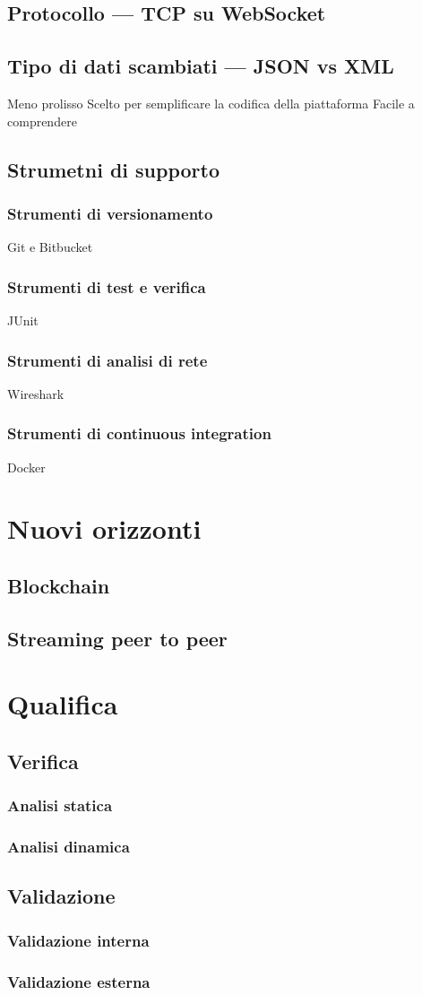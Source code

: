 	\subsection{Protocollo --- TCP su WebSocket}

	\subsection{Tipo di dati scambiati --- JSON vs XML}
	 Meno prolisso
	 Scelto per semplificare la codifica della piattaforma
	 Facile a comprendere
	\subsection{Strumetni di supporto}
				\subsubsection{Strumenti di versionamento}
			Git e Bitbucket
				\subsubsection{Strumenti di test e verifica}
			JUnit
				\subsubsection{Strumenti di analisi di rete}
			Wireshark
				\subsubsection{Strumenti di continuous integration}
			Docker
\section{Nuovi orizzonti}
	\subsection{Blockchain}
	\subsection{Streaming peer to peer}

\section{Qualifica}
	\subsection{Verifica}
				\subsubsection{Analisi statica}
				\subsubsection{Analisi dinamica}
	\subsection{Validazione}
				\subsubsection{Validazione interna}
				\subsubsection{Validazione esterna}